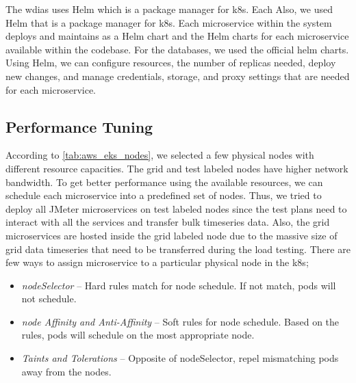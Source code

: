 The \acrshort{wdias} uses Helm \cite{CNCFHelmDocs} which is a package manager for \acrshort{k8s}. Each Also, we used Helm \cite{CNCFHelmDocs} that is a package manager for \acrshort{k8s}. Each microservice within the system deploys and maintains as a Helm chart and the Helm charts \cite{KarunarathneWdias-helm-charts:Deployments} for each microservice available within the codebase. For the databases, we used the official helm charts. Using Helm, we can configure resources, the number of replicas needed, deploy new changes, and manage credentials, storage, and proxy settings that are needed for each microservice.


\subsection{Performance Tuning}
\label{se:performance_tuning}
According to \cref{tab:aws_eks_nodes}, we selected a few physical nodes with different resource capacities. The grid and test labeled nodes have higher network bandwidth. To get better performance using the available resources, we can schedule each microservice into a predefined set of nodes. Thus, we tried to deploy all JMeter microservices on test labeled nodes since the test plans need to interact with all the services and transfer bulk timeseries data. Also, the grid microservices are hosted inside the grid labeled node due to the massive size of grid data timeseries that need to be transferred during the load testing. There are few ways to assign microservice to a particular physical node in the \acrshort{k8s};

\begin{itemize}
    \item \emph{nodeSelector} -- Hard rules match for node schedule. If not match, pods will not schedule.
    \item \emph{node Affinity and Anti-Affinity} -- Soft rules for node schedule. Based on the rules, pods will schedule on the most appropriate node.
    \item \emph{Taints and Tolerations} -- Opposite of nodeSelector, repel mismatching pods away from the nodes.
\end{itemize}

